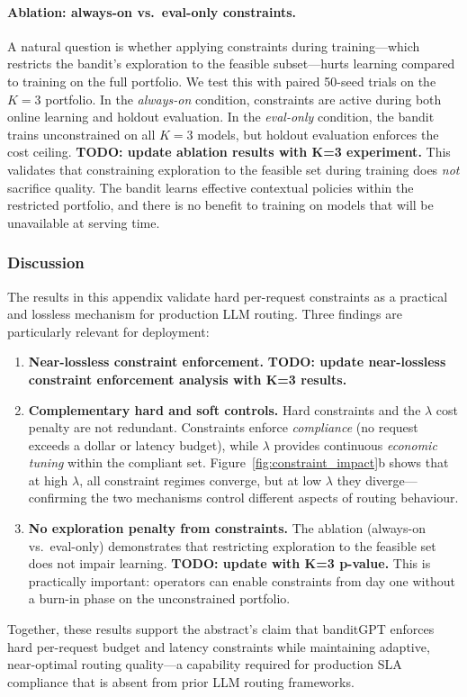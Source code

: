 \paragraph{Ablation: always-on vs.\ eval-only constraints.}
A natural question is whether applying constraints during training---which restricts the bandit's exploration to the feasible subset---hurts learning compared to training on the full portfolio.
We test this with paired 50-seed trials on the $K{=}3$ portfolio.
In the \emph{always-on} condition, constraints are active during both online learning and holdout evaluation.
In the \emph{eval-only} condition, the bandit trains unconstrained on all $K{=}3$ models, but holdout evaluation enforces the cost ceiling.
\textbf{TODO: update ablation results with K=3 experiment.}
This validates that constraining exploration to the feasible set during training does \emph{not} sacrifice quality.
The bandit learns effective contextual policies within the restricted portfolio, and there is no benefit to training on models that will be unavailable at serving time.

\subsubsection{Discussion}

The results in this appendix validate hard per-request constraints as a practical and lossless mechanism for production LLM routing.
Three findings are particularly relevant for deployment:

\begin{enumerate}[leftmargin=*,nosep]
  \item \textbf{Near-lossless constraint enforcement.}
  \textbf{TODO: update near-lossless constraint enforcement analysis with K=3 results.}

  \item \textbf{Complementary hard and soft controls.}
  Hard constraints and the $\lambda$ cost penalty are not redundant.
  Constraints enforce \emph{compliance} (no request exceeds a dollar or latency budget), while $\lambda$ provides continuous \emph{economic tuning} within the compliant set.
  Figure~\ref{fig:constraint_impact}b shows that at high $\lambda$, all constraint regimes converge, but at low $\lambda$ they diverge---confirming the two mechanisms control different aspects of routing behaviour.

  \item \textbf{No exploration penalty from constraints.}
  The ablation (always-on vs.\ eval-only) demonstrates that restricting exploration to the feasible set does not impair learning. \textbf{TODO: update with K=3 p-value.}
  This is practically important: operators can enable constraints from day one without a burn-in phase on the unconstrained portfolio.
\end{enumerate}

Together, these results support the abstract's claim that banditGPT enforces hard per-request budget and latency constraints while maintaining adaptive, near-optimal routing quality---a capability required for production SLA compliance that is absent from prior LLM routing frameworks.
